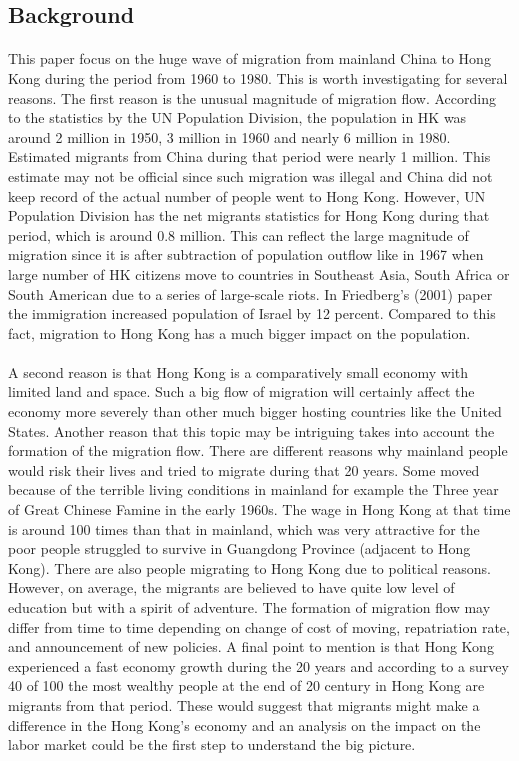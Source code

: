 \documentclass[12pt]{article}
\begin{document}
\subsection{Background}
\paragraph{}
This paper focus on the huge wave of migration from mainland China to Hong Kong during the period from 1960 to 1980. This is worth investigating for several reasons. The first reason is the unusual magnitude of migration flow. According to the statistics by the UN Population Division, the population in HK was around 2 million in 1950, 3 million in 1960 and nearly 6 million in 1980. Estimated migrants from China during that period were nearly 1 million. This estimate may not be official since such migration was illegal and China did not keep record of the actual number of people went to Hong Kong. However, UN Population Division has the net migrants statistics for Hong Kong during that period, which is around 0.8 million. This can reflect the large magnitude of migration since it is after subtraction of population outflow like in 1967 when  large number of HK citizens move to countries in Southeast Asia, South Africa or South American due to a series of large-scale riots. In Friedberg's (2001) paper the immigration increased population of Israel by 12 percent. Compared to this fact, migration to Hong Kong has a much bigger impact on the population. 

\paragraph{}
A second reason is that Hong Kong is a comparatively small economy with limited land and space. Such a big flow of migration will certainly affect the economy more severely than other much bigger hosting countries like the United States. Another reason that this topic may be intriguing takes into account the formation of the migration flow. There are different reasons why mainland people would risk their lives and tried to migrate during that 20 years. Some moved because of the terrible living conditions in mainland for example the Three year of Great Chinese Famine in the early 1960s. The wage in Hong Kong at that time is around 100 times than that in mainland, which was very attractive for the poor people struggled to survive in Guangdong Province (adjacent to Hong Kong). There are also people migrating to Hong Kong due to political reasons. However, on average, the migrants are believed to have quite low level of education but with a spirit of adventure. The formation of migration flow may differ from time to time depending on change of cost of moving, repatriation rate, and announcement of new policies. A final point to mention is that Hong Kong experienced a fast economy growth during the 20 years and according to a survey 40 of 100 the most wealthy people at the end of 20 century in Hong Kong are migrants from that period. These would suggest that migrants might make a difference in the Hong Kong's economy and an analysis on the impact on the labor market could be the first step to understand the big picture.
\end{document}

